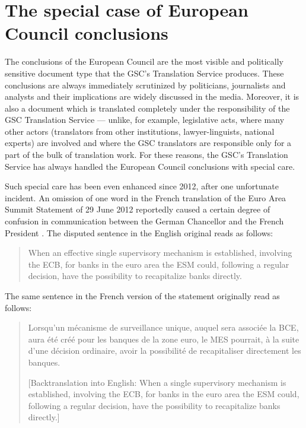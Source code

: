 \documentclass[output=paper]{langsci/langscibook}
\begin{document}
\section{The special case of European Council conclusions}\label{sec:hanzl:hanzl:6}

The conclusions of the European Council are the most visible and politically sensitive document type that the GSC’s Translation Service produces. These conclusions are always immediately scrutinized by politicians, journalists and analysts and their implications are widely discussed in the media. Moreover, it is also a document which is translated completely under the responsibility of the GSC Translation Service — unlike, for example, legislative acts, where many other actors (translators from other institutions, lawyer-linguists, national experts) are involved and where the GSC translators are responsible only for a part of the bulk of translation work. For these reasons, the GSC's Translation Service has always handled the European Council conclusions with special care.

Such special care has been even enhanced since 2012, after one unfortunate incident. An omission of one word in the French translation of the Euro Area Summit Statement of 29 June 2012 reportedly caused a certain degree of confusion in communication between the German Chancellor and the French President \citep{Rousselin2012}. The disputed sentence in the English original reads as follows:

\begin{quote}
{When an effective single supervisory mechanism is established, involving the ECB, for banks in the euro 
area the ESM could, following a regular decision, have the possibility to recapitalize banks directly.}
\end{quote}

The same sentence in the French version of the statement originally read as follows:

\largerpage
\begin{quote}
{Lorsqu'un mécanisme de surveillance unique, auquel sera associée la BCE, aura été créé pour les banques de la zone euro, le MES pourrait, à la suite d'une décision ordinaire, avoir la possibilité de recapitaliser directement les banques.}

[Backtranslation into English: When a single supervisory mechanism is established, involving the ECB, for banks in the euro area the ESM could, following a regular decision, have the possibility to recapitalize banks directly.]
\end{quote}
\end{document}
